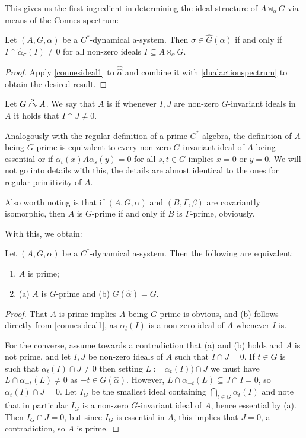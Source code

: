 This gives us the first ingredient in determining the ideal structure of $A \rtimes_\alpha G$ via means of the Connes spectrum:
\begin{corollary}
	Let $(A,G,\alpha)$ be a $C^*$-dynamical a-system. Then $\sigma \in \hat G ( \alpha)$ if and only if $I \cap \hat \alpha_\sigma (I) \neq 0$ for all non-zero ideals $I \subseteq A \rtimes_\alpha G$.
	\label{olpe1.5.4}
\end{corollary}
\begin{proof}
	Apply \cref{connesideal1} to $\hat{ \hat{ \alpha}}$ and combine it with \cref{dualactionspectrum} to obtain the desired result.
\end{proof}
\begin{definition}
	Let $G \stackrel{\alpha}{\curvearrowright} A$. We say that $A$ is  if whenever $I,J$ are non-zero $G$-invariant ideals in $A$ it holds that $I \cap J \neq 0$.
\end{definition}
\begin{remark}
	Analogously with the regular definition of a prime $C^*$-algebra, the definition of $A$ being $G$-prime is equivalent to every non-zero $G$-invariant ideal of $A$ being essential or if $\alpha_t(x) A \alpha_s(y)=0$ for all $s,t \in G$ implies $x = 0$ or $y = 0$. We will not go into details with this, the details are almost identical to the ones for regular primitivity of $A$.

	Also worth noting is that if $(A,G,\alpha)$ and $(B, \Gamma, \beta)$ are covariantly isomorphic, then $A$ is $G$-prime if and only if $B$ is $\Gamma$-prime, obviously.
\end{remark}
With this, we obtain:
\begin{lemma}
	Let $(A,G,\alpha)$ be a $C^*$-dynamical a-system. Then the following are equivalent:
	\begin{enumerate}[nosep]
		\item $A$ is prime;
		\item (a) $A$ is $G$-prime and (b) $G(\hat \alpha ) =G$.
	\end{enumerate}
	\label{olpe1.3.4}
\end{lemma}
\begin{proof}
	That $A$ is prime implies $A$ being $G$-prime is obvious, and (b) follows directly from \cref{connesideal1}, as $\alpha_t(I)$ is a non-zero ideal of $A$ whenever $I$ is.

	For the converse, assume towards a contradiction that (a) and (b) holds and $A$ is not prime, and let $I, J$ be non-zero ideals of $A$ such that $I \cap J = 0$. If $t \in G$ is such that $\alpha_t(I) \cap J \neq 0$ then setting $L := \alpha_t(I)) \cap J$ we must have $L \cap \alpha_{-t}(L) \neq 0$ as $-t \in G(\hat \alpha)$. However, $L \cap \alpha_{-t}(L) \subseteq  J \cap I = 0$, so $\alpha_t(I) \cap J = 0$. Let $I_G$ be the smallest ideal containing $\bigcap_{t \in G} \alpha_t(I)$ and note that in particular $I_G$ is a non-zero $G$-invariant ideal of $A$, hence essential by (a). Then $I_G \cap J = 0$, but since $I_G$ is essential in $A$, this implies that $J = 0$, a contradiction, so $A$ is prime.
\end{proof}
